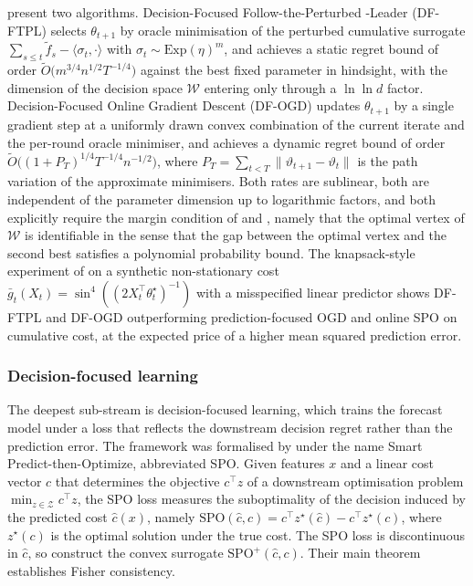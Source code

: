 \citet{Capitaine2025} present two algorithms. Decision-Focused Follow-the-Perturbed
-Leader (DF-FTPL) selects $\theta_{t+1}$ by oracle minimisation of the perturbed
cumulative surrogate $\sum_{s \le t} \widetilde f_s - \langle \sigma_t, \cdot
\rangle$ with $\sigma_t \sim \mathrm{Exp}(\eta)^m$, and achieves a static regret
bound of order $\widetilde O\bigl( m^{3/4} n^{1/2} T^{-1/4} \bigr)$ against the
best fixed parameter in hindsight, with the dimension of the decision space
$\mathcal W$ entering only through a $\ln \ln d$ factor. Decision-Focused Online
Gradient Descent (DF-OGD) updates $\theta_{t+1}$ by a single gradient step at a
uniformly drawn convex combination of the current iterate and the per-round oracle
minimiser, and achieves a dynamic regret bound of order
$\widetilde O\bigl( (1 + P_T)^{1/4} T^{-1/4} n^{-1/2} \bigr)$, where
$P_T = \sum_{t < T} \lVert \vartheta_{t+1} - \vartheta_t \rVert$ is the path
variation of the approximate minimisers. Both rates are sublinear, both are
independent of the parameter dimension up to logarithmic factors, and both
explicitly require the margin condition of \citet{Mammen1999} and
\citet{Tsybakov2004}, namely that the optimal vertex of $\mathcal W$ is
identifiable in the sense that the gap between the optimal vertex and the second
best satisfies a polynomial probability bound. The knapsack-style experiment of
\citet{Capitaine2025} on a synthetic non-stationary cost
$\bar g_t(X_t) = \sin^4((2 X_t^\top \theta_t^\star)^{-1})$ with a misspecified
linear predictor shows DF-FTPL and DF-OGD outperforming prediction-focused OGD
and online SPO on cumulative cost, at the expected price of a higher mean squared
prediction error.

\subsubsection{Decision-focused learning}
\label{sec:dfl}

The deepest sub-stream is decision-focused learning, which trains the forecast
model under a loss that reflects the downstream decision regret rather than the
prediction error. The framework was formalised by \citet{ElmachtoubGrigas2022} under
the name Smart Predict-then-Optimize, abbreviated SPO. Given features $x$ and a
linear cost vector $c$ that determines the objective $c^\top z$ of a downstream
optimisation problem $\min_{z \in \mathcal Z} c^\top z$, the SPO loss measures the
suboptimality of the decision induced by the predicted cost $\hat c(x)$, namely
$\mathrm{SPO}(\hat c, c) = c^\top z^\star(\hat c) - c^\top z^\star(c)$, where
$z^\star(c)$ is the optimal solution under the true cost. The SPO loss is
discontinuous in $\hat c$, so \citet{ElmachtoubGrigas2022} construct the convex
surrogate $\mathrm{SPO}^+(\hat c, c)$. Their main theorem establishes Fisher
consistency.

